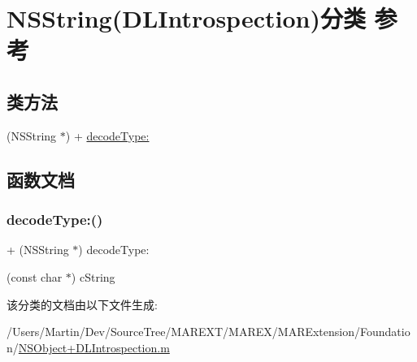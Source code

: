 \hypertarget{category_n_s_string_07_d_l_introspection_08}{}\section{N\+S\+String(D\+L\+Introspection)分类 参考}
\label{category_n_s_string_07_d_l_introspection_08}
\subsection*{类方法}
\begin{DoxyCompactItemize}
\item 
(N\+S\+String $\ast$) + \hyperlink{category_n_s_string_07_d_l_introspection_08_ab49ade9c485b9d6afd6a49f5bdd53b71}{decode\+Type\+:}
\end{DoxyCompactItemize}


\subsection{函数文档}
\mbox{\label{category_n_s_string_07_d_l_introspection_08_ab49ade9c485b9d6afd6a49f5bdd53b71}} 
\subsubsection{\texorpdfstring{decode\+Type\+:()}{decodeType:()}}
{\footnotesize\ttfamily + (N\+S\+String $\ast$) decode\+Type\+: \begin{DoxyParamCaption}\item[{(const char $\ast$)}]{c\+String }\end{DoxyParamCaption}}



该分类的文档由以下文件生成\+:\begin{DoxyCompactItemize}
\item 
/\+Users/\+Martin/\+Dev/\+Source\+Tree/\+M\+A\+R\+E\+X\+T/\+M\+A\+R\+E\+X/\+M\+A\+R\+Extension/\+Foundation/\hyperlink{_n_s_object_09_d_l_introspection_8m}{N\+S\+Object+\+D\+L\+Introspection.\+m}\end{DoxyCompactItemize}
